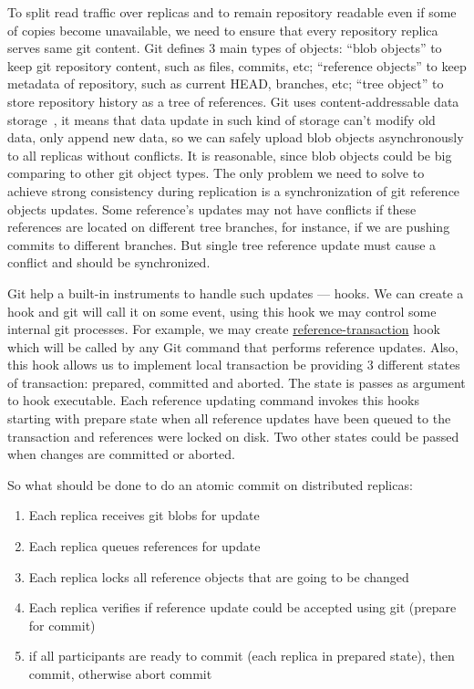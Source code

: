 \documentclass[sigplan, screen, nonacm, 11pt]{acmart}
\begin{document}
To split read traffic over replicas and to remain repository readable even if some of copies become unavailable,
we need to ensure that every repository replica serves same git content.
Git defines 3 main types of objects: ``blob objects'' to keep git repository content, such as files, commits, etc;
``reference objects'' to keep metadata of repository, such as current HEAD, branches, etc; ``tree object'' to
store repository history as a tree of references. Git uses content-addressable
data storage~\cite{content-addressable-storage},
it means that data update in such kind of storage can't modify old data, only append new data, so we can safely
upload blob objects asynchronously to all replicas without conflicts.
It is reasonable, since blob objects could be big comparing to
other git object types. The only problem we need to solve to achieve strong consistency during replication
is a synchronization of git reference objects updates. Some reference's updates may not have conflicts if these references
are located on different tree branches, for instance, if we are pushing commits to different branches. But
single tree reference update must cause a conflict and should be synchronized.

Git help a built-in instruments to handle such updates --- hooks. We can create a hook and git will call it on some event,
using this hook we may control some internal git processes. For example, we may create
\href{https://git-scm.com/docs/githooks.html\#\_reference\_transaction}{reference-transaction} hook
which will be called by any Git command that performs reference updates. Also, this hook allows us to implement
local transaction be providing 3 different states of transaction: prepared, committed and aborted.
The state is passes as argument to hook executable.
Each reference updating command invokes this hooks starting with prepare state when all reference updates
have been queued to the transaction and references were locked on disk. Two other states could be passed
when changes are committed or aborted.

So what should be done to do an atomic commit on distributed replicas:
\begin{enumerate}
  \item Each replica receives git blobs for update
  \item Each replica queues references for update
  \item Each replica locks all reference objects that are going to be changed
  \item Each replica verifies if reference update could be accepted using git (prepare for commit)
  \item if all participants are ready to commit (each replica in prepared state), then commit, otherwise abort commit
\end{enumerate}
\end{document}
